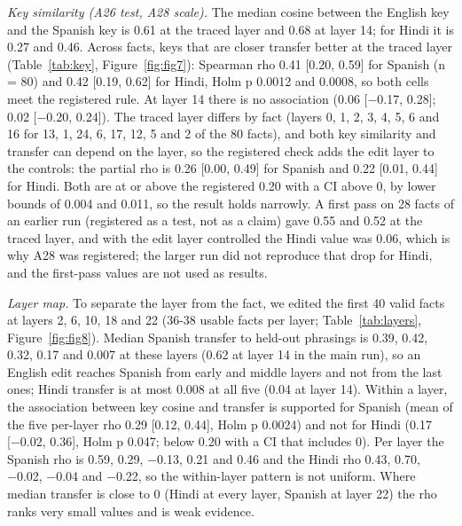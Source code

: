 \documentclass[11pt]{article}
\begin{document}
\emph{Key similarity (A26 test, A28 scale).} The median cosine between the English key and the Spanish key is 0.61 at the traced layer and 0.68 at layer 14; for Hindi it is 0.27 and 0.46. Across facts, keys that are closer transfer better at the traced layer (Table~\ref{tab:key}, Figure~\ref{fig:fig7}): Spearman rho 0.41 {[}0.20, 0.59{]} for Spanish (n = 80) and 0.42 {[}0.19, 0.62{]} for Hindi, Holm p 0.0012 and 0.0008, so both cells meet the registered rule. At layer 14 there is no association (0.06 {[}−0.17, 0.28{]}; 0.02 {[}−0.20, 0.24{]}). The traced layer differs by fact (layers 0, 1, 2, 3, 4, 5, 6 and 16 for 13, 1, 24, 6, 17, 12, 5 and 2 of the 80 facts), and both key similarity and transfer can depend on the layer, so the registered check adds the edit layer to the controls: the partial rho is 0.26 {[}0.00, 0.49{]} for Spanish and 0.22 {[}0.01, 0.44{]} for Hindi. Both are at or above the registered 0.20 with a CI above 0, by lower bounds of 0.004 and 0.011, so the result holds narrowly. A first pass on 28 facts of an earlier run (registered as a test, not as a claim) gave 0.55 and 0.52 at the traced layer, and with the edit layer controlled the Hindi value was 0.06, which is why A28 was registered; the larger run did not reproduce that drop for Hindi, and the first-pass values are not used as results.

\emph{Layer map.} To separate the layer from the fact, we edited the first 40 valid facts at layers 2, 6, 10, 18 and 22 (36-38 usable facts per layer; Table~\ref{tab:layers}, Figure~\ref{fig:fig8}). Median Spanish transfer to held-out phrasings is 0.39, 0.42, 0.32, 0.17 and 0.007 at these layers (0.62 at layer 14 in the main run), so an English edit reaches Spanish from early and middle layers and not from the last ones; Hindi transfer is at most 0.008 at all five (0.04 at layer 14). Within a layer, the association between key cosine and transfer is supported for Spanish (mean of the five per-layer rho 0.29 {[}0.12, 0.44{]}, Holm p 0.0024) and not for Hindi (0.17 {[}−0.02, 0.36{]}, Holm p 0.047; below 0.20 with a CI that includes 0). Per layer the Spanish rho is 0.59, 0.29, −0.13, 0.21 and 0.46 and the Hindi rho 0.43, 0.70, −0.02, −0.04 and −0.22, so the within-layer pattern is not uniform. Where median transfer is close to 0 (Hindi at every layer, Spanish at layer 22) the rho ranks very small values and is weak evidence.
\end{document}
